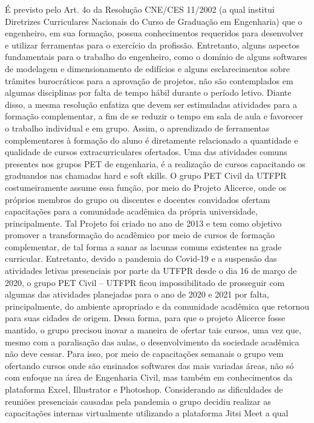 É previsto pelo Art. 4o da Resolução CNE/CES 11/2002 (a qual institui Diretrizes 
Curriculares Nacionais do Curso de Graduação em Engenharia) que o engenheiro, em sua 
formação, possua conhecimentos requeridos para desenvolver e utilizar ferramentas para o 
exercício da profissão. Entretanto, alguns aspectos fundamentais para o trabalho do engenheiro, 
como o domínio de alguns softwares de modelagem e dimensionamento de edifícios e alguns 
esclarecimentos sobre trâmites burocráticos para a aprovação de projetos, não são contemplados 
em algumas disciplinas por falta de tempo hábil durante o período letivo.
Diante disso, a mesma resolução enfatiza que devem ser estimuladas atividades para a 
formação complementar, a fim de se reduzir o tempo em sala de aula e favorecer o trabalho 
individual e em grupo. Assim, o aprendizado de ferramentas complementares à formação do aluno 
é diretamente relacionado a quantidade e qualidade de cursos extracurriculares ofertados.
Uma das atividades comuns presentes nos grupos PET de engenharia, é a realização de 
cursos capacitando os graduandos nas chamadas hard e soft skills. O grupo PET Civil da UTFPR 
costumeiramente assume essa função, por meio do Projeto Alicerce, onde os próprios membros do 
grupo ou discentes e docentes convidados ofertam capacitações para a comunidade acadêmica da 
própria universidade, principalmente. Tal Projeto foi criado no ano de 2013 e tem como objetivo 
promover a transformação do acadêmico por meio de cursos de formação complementar, de tal 
forma a sanar as lacunas comuns existentes na grade curricular.
Entretanto, devido a pandemia do Covid-19 e a suspensão das atividades letivas presenciais 
por parte da UTFPR desde o dia 16 de março de 2020, o grupo PET Civil – UTFPR ficou 
impossibilitado de prosseguir com algumas das atividades planejadas para o ano de 2020 e 2021
por falta, principalmente, do ambiente apropriado e da comunidade acadêmica que retornou para 
suas cidades de origem.
Dessa forma, para que o projeto Alicerce fosse mantido, o grupo precisou inovar a maneira 
de ofertar tais cursos, uma vez que, mesmo com a paralisação das aulas, o desenvolvimento da 
sociedade acadêmica não deve cessar. Para isso, por meio de capacitações semanais o grupo vem 
ofertando cursos onde são ensinados softwares das mais variadas áreas, não só com enfoque na 
área de Engenharia Civil, mas também em conhecimentos da plataforma Excel, Illustrator e 
Photoshop.
Considerando as dificuldades de reuniões presenciais causadas pela pandemia o grupo
decidiu realizar as capacitações internas virtualmente utilizando a plataforma Jitsi Meet a qual 
